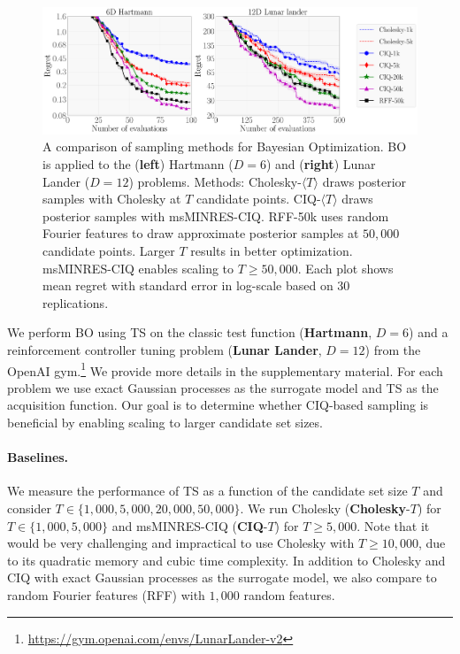 \begin{figure}[t!]
  \centering
  \includegraphics[width=\linewidth]{figures/bo_ciq.pdf}
  \caption[
    A comparison of sampling methods for Bayesian optimization (BO) via TS.
    TS is applied to the Hartmann ($D=6$) and Lunar Lander ($D=12$).
  ]{
    A comparison of sampling methods for Bayesian Optimization.
    BO is applied to the ({\bf left}) Hartmann ($D=6$) and ({\bf right}) Lunar Lander ($D=12$) problems.
    Methods: Cholesky-$\langle T \rangle$ draws posterior samples with Cholesky at $T$ candidate points.
    CIQ-$\langle T \rangle$ draws posterior samples with msMINRES-CIQ.
    RFF-50k uses random Fourier features to draw approximate posterior samples at $50,\!000$ candidate points.
    Larger $T$ results in better optimization.
    msMINRES-CIQ enables scaling to $T \geq 50,\!000$.
    Each plot shows mean regret with standard error in log-scale based on 30 replications.
  }
  \label{fig:bayesopt}
\end{figure}

We perform BO using TS on the classic test function ({\bf Hartmann}, $D=6$) and a reinforcement controller tuning problem ({\bf Lunar Lander}, $D=12$) from the OpenAI gym.\footnote{\url{https://gym.openai.com/envs/LunarLander-v2}}
We provide more details in the supplementary material.
For each problem we use exact Gaussian processes as the surrogate model and TS as the acquisition function.
Our goal is to determine whether CIQ-based sampling is beneficial by enabling scaling to larger candidate set sizes.

\paragraph{Baselines.}
We measure the performance of TS as a function of the candidate set size $T$ and consider $T \in \{ 1,\!000, 5,\!000, 20,\!000, 50,\!000 \}$.
We run Cholesky ({\bf Cholesky}-$T$) for  $T \in \{ 1,\!000, 5,\!000\}$ and msMINRES-CIQ ({\bf CIQ}-$T$) for $T \ge 5,\!000$.
Note that it would be very challenging and impractical to use Cholesky with $T \geq 10,\!000$, due to its quadratic memory and cubic time complexity.
In addition to Cholesky and CIQ with exact Gaussian processes as the surrogate model, we also compare to random Fourier features (RFF) \cite{rahimi2008random} with $1,\!000$ random features.

